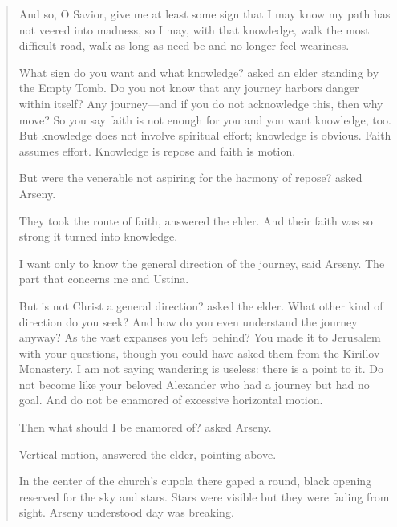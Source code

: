 \begin{quote}
	And so, O Savior, give me at least some sign that I may know my path has not veered into madness, so I may, with that knowledge, walk the most difficult road, walk as long as need be and no longer feel weariness.

	What sign do you want and what knowledge? asked an elder standing by the Empty Tomb. Do you not know that any journey harbors danger within itself? Any journey—and if you do not acknowledge this, then why move? So you say faith is not enough for you and you want knowledge, too. But knowledge does not involve spiritual effort; knowledge is obvious. Faith assumes effort. Knowledge is repose and faith is motion.

	But were the venerable not aspiring for the harmony of repose? asked Arseny.

	They took the route of faith, answered the elder. And their faith was so strong it turned into knowledge.

	I want only to know the general direction of the journey, said Arseny. The part that concerns me and Ustina.

	But is not Christ a general direction? asked the elder. What other kind of direction do you seek? And how do you even understand the journey anyway? As the vast expanses you left behind? You made it to Jerusalem with your questions, though you could have asked them from the Kirillov Monastery. I am not saying wandering is useless: there is a point to it. Do not become like your beloved Alexander who had a journey but had no goal. And do not be enamored of excessive horizontal motion.

	Then what should I be enamored of? asked Arseny.

	Vertical motion, answered the elder, pointing above.

	In the center of the church’s cupola there gaped a round, black opening reserved for the sky and stars. Stars were visible but they were fading from sight. Arseny understood day was breaking.
\end{quote}